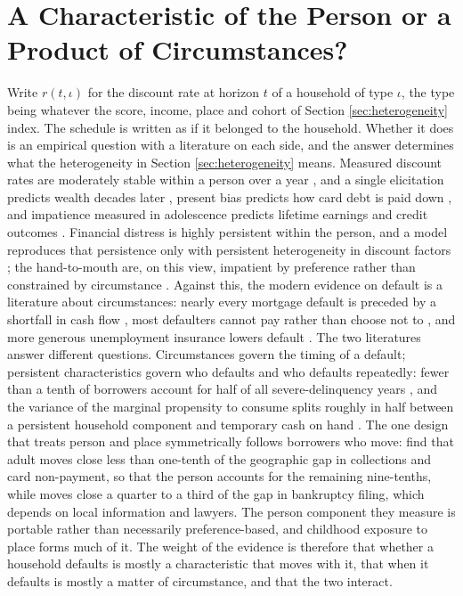 \section{A Characteristic of the Person or a Product of Circumstances?}\label{appendix:traits}

Write $r(t, \iota)$ for the discount rate at horizon $t$ of a household of type $\iota$, the type being whatever the score, income, place and cohort of Section \ref{sec:heterogeneity} index. The schedule is written as if it belonged to the household. Whether it does is an empirical question with a literature on each side, and the answer determines what the heterogeneity in Section \ref{sec:heterogeneity} means. Measured discount rates are moderately stable within a person over a year \citep{meier_temporal_2015}, and a single elicitation predicts wealth decades later \citep{epper_time_2020}, present bias predicts how card debt is paid down \citep{kuchler_sticking_2021}, and impatience measured in adolescence predicts lifetime earnings and credit outcomes \citep{cadena_human_2015}. Financial distress is highly persistent within the person, and a model reproduces that persistence only with persistent heterogeneity in discount factors \citep{athreya_persistence_2019}; the hand-to-mouth are, on this view, impatient by preference rather than constrained by circumstance \citep{aguiar_who_2024}. Against this, the modern evidence on default is a literature about circumstances: nearly every mortgage default is preceded by a shortfall in cash flow \citep{ganong_why_2023}, most defaulters cannot pay rather than choose not to \citep{gerardi_cant_2018}, and more generous unemployment insurance lowers default \citep{hsu_unemployment_2018}. The two literatures answer different questions. Circumstances govern the timing of a default; persistent characteristics govern who defaults and who defaults repeatedly: fewer than a tenth of borrowers account for half of all severe-delinquency years \citep{athreya_persistence_2019}, and the variance of the marginal propensity to consume splits roughly in half between a persistent household component and temporary cash on hand \citep{gelman_what_2021}. The one design that treats person and place symmetrically follows borrowers who move: \citet{keys_place_2023} find that adult moves close less than one-tenth of the geographic gap in collections and card non-payment, so that the person accounts for the remaining nine-tenths, while moves close a quarter to a third of the gap in bankruptcy filing, which depends on local information and lawyers. The person component they measure is portable rather than necessarily preference-based, and childhood exposure to place forms much of it. The weight of the evidence is therefore that whether a household defaults is mostly a characteristic that moves with it, that when it defaults is mostly a matter of circumstance, and that the two interact.

